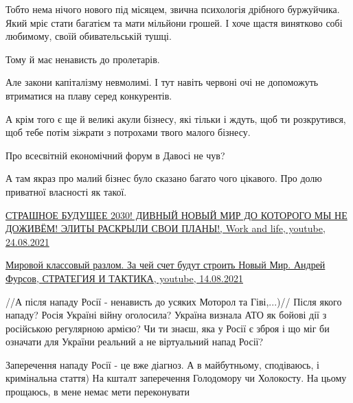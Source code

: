 \begin{itemize}
\begin{itemize}
 

Тобто нема нічого нового під місяцем, звична психологія дрібного буржуйчика.
Який мріє стати багатієм та мати мільйони грошей. І хоче щастя винятково собі
любимому, своїй обивательській тушці.

Тому й має ненависть до пролетарів.

Але закони капіталізму невмолимі. І тут навіть червоні очі не допоможуть
втриматися на плаву серед конкурентів.

А крім того є ще й великі акули бізнесу, які тільки і ждуть, щоб ти
розкрутився, щоб тебе потім зіжрати з потрохами твого малого бізнесу.

Про всесвітній економічний форум в Давосі не чув?

А там якраз про малий бізнес було сказано багато чого цікавого. Про долю
приватної власності як такої.

\href{https://youtu.be/9WFCkMUCHr4}{%
СТРАШНОЕ БУДУЩЕЕ 2030! ДИВНЫЙ НОВЫЙ МИР ДО КОТОРОГО МЫ НЕ ДОЖИВЁМ! ЭЛИТЫ РАСКРЫЛИ СВОИ ПЛАНЫ!, %
Work and life, youtube, 24.08.2021%
}

\href{https://youtu.be/DUr18NJBkQo}{%
Мировой классовый разлом. За чей счет будут строить Новый Мир. Андрей Фурсов, %
СТРАТЕГИЯ И ТАКТИКА, youtube, 14.08.2021%
}

 

//А після нападу Росії - ненависть до усяких Моторол та Гіві,...)//
Після якого нападу?
Росія Україні війну оголосила?
Україна визнала АТО як бойові дії з російською регулярною армією?
Чи ти знаєш, яка у Росії є зброя і що міг би означати для України реальний а не віртуальний напад Росії?


Заперечення нападу Росії - це вже діагноз. А в майбутньому, сподіваюсь, і
кримінальна стаття) На кшталт заперечення Голодомору чи Холокосту.
На цьому прощаюсь, в мене немає мети переконувати


\end{itemize}
\end{itemize}
